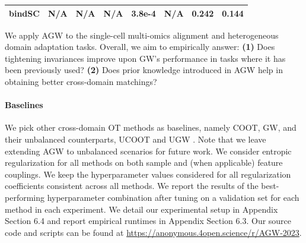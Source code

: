 \begin{table}[t]
\begin{center}
{\begin{tabular}{lccccccc}
\multicolumn{1}{l|}{\textbf{bindSC}} & N/A                                                             & N/A                                                            & N/A                                                            & 3.8e-4                                                                         & N/A                                                         & 0.242                                                             & 0.144                                                         \\ \hline
\end{tabular}}
\end{center}
\end{table}

We apply AGW to the single-cell multi-omics alignment and heterogeneous domain adaptation tasks.
Overall, we aim to empirically answer:
\textbf{(1)} Does tightening invariances improve upon GW's performance in tasks where
it has been previously used? \textbf{(2)} Does prior knowledge introduced in AGW help
in obtaining better cross-domain matchings?


\paragraph{Baselines} We pick other cross-domain OT methods as baselines, namely COOT, GW,
and their unbalanced counterparts, UCOOT \citep{Tran23} and UGW \citep{Sejourne20}.
Note that we leave extending AGW to unbalanced scenarios for future work.
We consider entropic regularization for all methods on both sample and
(when applicable) feature couplings. We keep the hyperparameter values considered
for all regularization coefficients consistent across all methods. We report the results of
the best-performing hyperparameter combination after tuning on a validation set for each method
in each experiment. We detail our experimental setup in Appendix Section 6.4 and
report empirical runtimes in Appendix Section 6.3. Our source code and scripts can be found at
\url{https://anonymous.4open.science/r/AGW-2023}.

